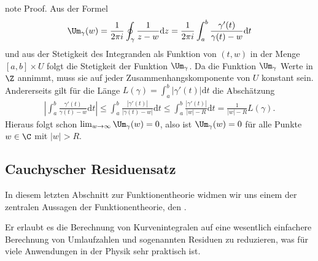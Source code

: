 \documentclass[letterpaper,10pt,german]{jupyterBook}
\begin{document}
\begin{sphinxadmonition}{note}
\sphinxAtStartPar
Proof. Aus der Formel
\begin{equation*}
\begin{split}\Um_\gamma(w) = \frac{1}{2 \pi i} \oint_\gamma \frac{1}{z-w} \mathrm{d}z = \frac{1}{2 \pi i} \int_a^b \frac{\gamma'(t)}{\gamma(t) - w} \mathrm{d}t\end{split}
\end{equation*}
\sphinxAtStartPar
und aus der Stetigkeit des Integranden als Funktion von \((t,w)\) in der Menge \([a,b] \times U\) folgt die Stetigkeit der Funktion \(\Um_\gamma\).
Da die Funktion \(\Um_\gamma\) Werte in \(\Z\) annimmt, muss sie auf jeder Zusammenhangskomponente von \(U\) konstant sein.
Andererseits gilt für die Länge \(L(\gamma) = \int_a^b |\gamma'(t)| \mathrm{d}t\) die Abschätzung
\begin{equation*}
\begin{split}\left| \int_a^b \frac{\gamma'(t)}{\gamma(t)-w} \mathrm{d}t \right| \leq \int_a^b \frac{|\gamma'(t)|}{|\gamma(t) - w|} \mathrm{d}t \leq \int_a^b \frac{|\gamma'(t)|}{|w| - R} \mathrm{d}t = \frac{1}{|w| - R} L(\gamma). \end{split}
\end{equation*}
\sphinxAtStartPar
Hieraus folgt schon \(\lim_{w \rightarrow \infty} \Um_\gamma(w) = 0\), also ist \(\Um_\gamma(w) = 0\) für alle Punkte \(w \in \C\) mit \(|w| > R\).
\end{sphinxadmonition}


\subsection{Cauchyscher Residuensatz}
\label{\detokenize{complexanalysis/residuensatz:cauchyscher-residuensatz}}
\sphinxAtStartPar
In diesem letzten Abschnitt zur Funktionentheorie widmen wir uns einem der zentralen Aussagen der Funktionentheorie, den .

\sphinxAtStartPar
Er erlaubt es die Berechnung von Kurvenintegralen auf eine wesentlich einfachere Berechnung von Umlaufzahlen und sogenannten Residuen zu reduzieren, was für viele Anwendungen in der Physik sehr praktisch ist.
\end{document}

